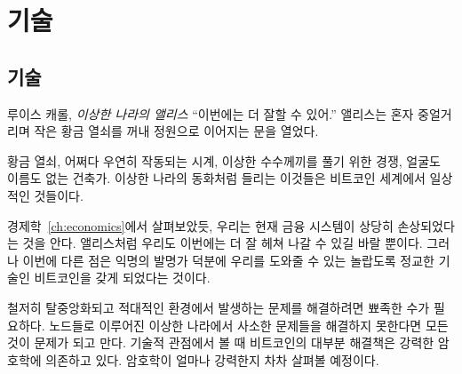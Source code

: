 \part{기술}
\label{ch:technology}
\chapter*{기술}

\begin{comment}
	\begin{chapquote}{Lewis Carroll, \textit{Alice in Wonderland}}
		\enquote{Now, I'll manage better this time} she said to herself, and began by taking
		the little golden key, and unlocking the door that led into the garden
	\end{chapquote}
\end{comment}
\begin{chapquote}{루이스 캐롤, \textit{이상한 나라의 앨리스}}
	\enquote{이번에는 더 잘할 수 있어.} 앨리스는 혼자 중얼거리며 작은 황금 열쇠를 꺼내 정원으로 이어지는 문을 열었다.
\end{chapquote}

\begin{comment}
	Golden keys, clocks which only work by chance, races to solve
	strange riddles, and builders that don't have faces or names. What sounds like
	fairy tales from Wonderland is daily business in the world of Bitcoin.
\end{comment}
황금 열쇠, 어쩌다 우연히 작동되는 시계, 이상한 수수께끼를 풀기 위한 경쟁, 얼굴도 이름도 없는 건축가.
이상한 나라의 동화처럼 들리는 이것들은 비트코인 세계에서 일상적인 것들이다.

\begin{comment}
	As we explored in Chapter~\ref{ch:economics}, large parts of the current financial system are systematically broken. 
	Like Alice, we can only hope to manage better this time. 
	But, thanks to a pseudonymous inventor, we have incredibly sophisticated technology to support us this time around: Bitcoin.
\end{comment}
경제학~\ref{ch:economics}에서 살펴보았듯, 우리는 현재 금융 시스템이 상당히 손상되었다는 것을 안다.
앨리스처럼 우리도 이번에는 더 잘 헤쳐 나갈 수 있길 바랄 뿐이다.
그러나 이번에 다른 점은 익명의 발명가 덕분에 우리를 도와줄 수 있는 놀랍도록 정교한 기술인 비트코인을 갖게 되었다는 것이다. 

\begin{comment}
	Solving problems in a radically decentralized and adversarial environment
	requires unique solutions. What would otherwise be trivial problems to solve
	are everything but in this strange world of nodes. Bitcoin relies on strong
	cryptography for most solutions, at least if looked at through the lens of
	technology. Just how strong this cryptography is will be explored in one of the
	following lessons.
\end{comment}
철저히 탈중앙화되고 적대적인 환경에서 발생하는 문제를 해결하려면 뾰족한 수가 필요하다.
노드들로 이루어진 이상한 나라에서 사소한 문제들을 해결하지 못한다면 모든 것이 문제가 되고 만다.
기술적 관점에서 볼 때 비트코인의 대부분 해결책은 강력한 암호학에 의존하고 있다. 
암호학이 얼마나 강력한지 차차 살펴볼 예정이다.

